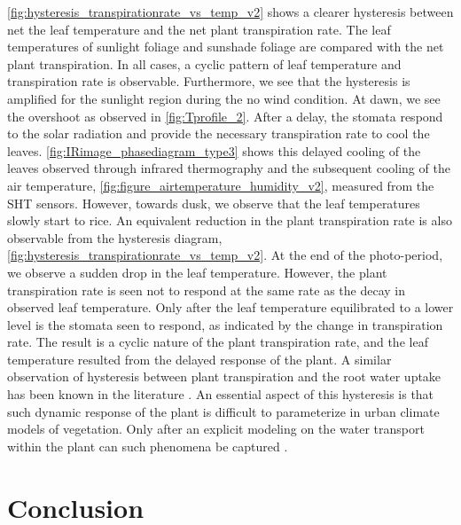 \cref{fig:hysteresis_transpirationrate_vs_temp_v2} shows a clearer hysteresis between net the leaf temperature and the net plant transpiration rate. The leaf temperatures of sunlight foliage and sunshade foliage are compared with the net plant transpiration. In all cases, a cyclic pattern of leaf temperature and transpiration rate is observable. Furthermore, we see that the hysteresis is amplified for the sunlight region during the no wind condition. At dawn, we see the overshoot as observed in \cref{fig:Tprofile_2}. After a delay, the stomata respond to the solar radiation and provide the necessary transpiration rate to cool the leaves. \cref{fig:IRimage_phasediagram_type3} shows this delayed cooling of the leaves observed through infrared thermography and the subsequent cooling of the air temperature, \cref{fig:figure_airtemperature_humidity_v2}, measured from the SHT sensors. However, towards dusk, we observe that the leaf temperatures slowly start to rice. An equivalent reduction in the plant transpiration rate is also observable from the hysteresis diagram, \cref{fig:hysteresis_transpirationrate_vs_temp_v2}. At the end of the photo-period, we observe a sudden drop in the leaf temperature. However, the plant transpiration rate is seen not to respond at the same rate as the decay in observed leaf temperature. Only after the leaf temperature equilibrated to a lower level is the stomata seen to respond, as indicated by the change in transpiration rate. The result is a cyclic nature of the plant transpiration rate, and the leaf temperature resulted from the delayed response of the plant. A similar observation of hysteresis between plant transpiration and the root water uptake has been known in the literature \citep{Dauzat2001, Williams1996}. An essential aspect of this hysteresis is that such dynamic response of the plant is difficult to parameterize in urban climate models of vegetation. Only after an explicit modeling on the water transport within the plant can such phenomena be captured \citep{Huang2017, Manzoni2011}.



\section{Conclusion}

